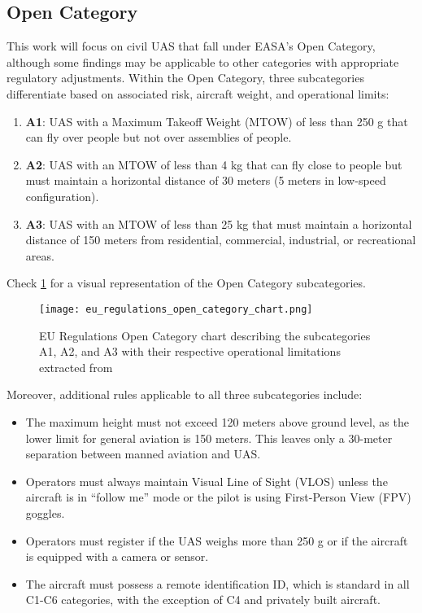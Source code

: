 \subsection{Open Category}
This work will focus on civil UAS that fall under EASA's Open Category, although some findings may be applicable to other categories with appropriate regulatory adjustments. Within the Open Category, three subcategories differentiate based on associated risk, aircraft weight, and operational limits:

\begin{enumerate}
  \item \textbf{A1}: UAS with a Maximum Takeoff Weight (MTOW) of less than 250 g that can fly over people but not over assemblies of people.

  \item \textbf{A2}: UAS with an MTOW of less than 4 kg that can fly close to people but must maintain a horizontal distance of 30 meters (5 meters in low-speed configuration).

  \item \textbf{A3}: UAS with an MTOW of less than 25 kg that must maintain a horizontal distance of 150 meters from residential, commercial, industrial, or recreational areas.
\end{enumerate}

Check \cref{fig:eu_regulations_open_category_chart} for a visual representation of the Open Category subcategories.

\begin{figure}
  \texttt{[image: eu\_regulations\_open\_category\_chart.png]}
  \caption{EU Regulations Open Category chart describing the subcategories A1, A2, and A3 with their respective operational limitations extracted from \autocite{ageagleEuropeanUnion}}
  \label{fig:eu_regulations_open_category_chart}
\end{figure}

Moreover, additional rules applicable to all three subcategories include:

\begin{itemize}
  \item The maximum height must not exceed 120 meters above ground level, as the lower limit for general aviation is 150 meters. This leaves only a 30-meter separation between manned aviation and UAS.

  \item Operators must always maintain Visual Line of Sight (VLOS) unless the aircraft is in ``follow me'' mode or the pilot is using First-Person View (FPV) goggles.

  \item Operators must register if the UAS weighs more than 250 g or if the aircraft is equipped with a camera or sensor.

  \item The aircraft must possess a remote identification ID, which is standard in all C1-C6 categories, with the exception of C4 and privately built aircraft.
\end{itemize}
